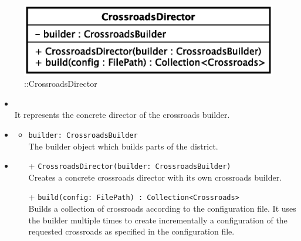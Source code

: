 \begin{figure}[h]
\centering
\includegraphics[scale=0.6,keepaspectratio]{images/solution/app/backend/crossroads_director.eps}
\caption{\pReactiveBuild::CrossroadsDirector}
\label{fig:sd-app-crossroads_director}
\end{figure}
\FloatBarrier
\begin{itemize}
  \item \textbf{\descr} \\
    It represents the concrete director of the crossroads builder.
    \item \textbf{\attrs}
  \begin{itemize}
    \item \texttt{builder: CrossroadsBuilder} \\
The builder object which builds parts of the district.
  \end{itemize}
  \item \textbf{\ops}
  \begin{itemize} 
    \item[+] \texttt{CrossroadsDirector(builder: CrossroadsBuilder)} \\
Creates a concrete crossroads director with its own crossroads builder.
    \item[+] \texttt{build(config: FilePath) : Collection<Crossroads>} \\
Builds a collection of crossroads according to the configuration file. 
It uses the builder multiple times 
to create incrementally a configuration of the requested crossroads as specified
in the configuration file. 
  \end{itemize}
\end{itemize}
